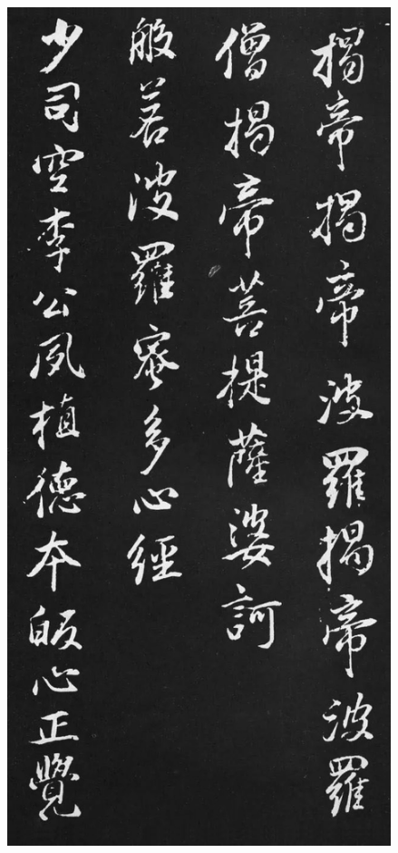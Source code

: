 \documentclass[a4paper,twoside]{article}
\begin{document}
\begin{figure}[ht]
\centering
\includegraphics[width=11.2cm]{images/dongqichang-7}
\end{figure}
\end{document}
